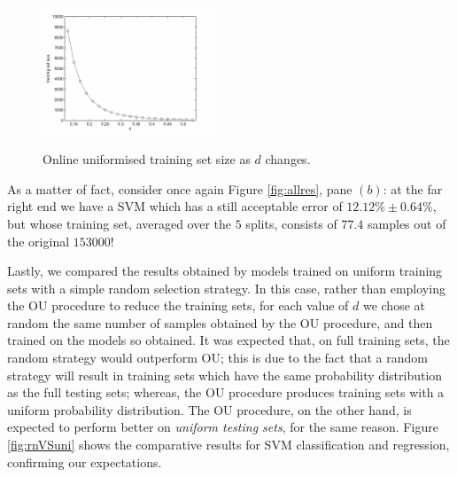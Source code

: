 \begin{figure}[!ht] \centering
  \includegraphics[width=0.45\textwidth]{figs/fig_allSize.png} \\
  \caption{Online uniformised training set size as $d$ changes.}
  \label{fig:TSsize}
\end{figure}

As a matter of fact, consider once again Figure \ref{fig:allres}, pane
$(b)$: at the far right end we have a SVM which has a still acceptable
error of $12.12\% \pm 0.64\%$, but whose training set, averaged over
the $5$ splits, consists of $77.4$ samples out of the original
$153000$!

Lastly, we compared the results obtained by models trained on uniform
training sets with a simple random selection strategy. In this case,
rather than employing the OU procedure to reduce the training sets,
for each value of $d$ we chose at random the same number of samples
obtained by the OU procedure, and then trained on the models so
obtained. It was expected that, on full training sets, the random
strategy would outperform OU; this is due to the fact that a random
strategy will result in training sets which have the same probability
distribution as the full testing sets; whereas, the OU procedure
produces training sets with a uniform probability distribution. The OU
procedure, on the other hand, is expected to perform better on
\emph{uniform testing sets}, for the same reason. Figure
\ref{fig:rnVSuni} shows the comparative results for SVM classification
and regression, confirming our expectations.

